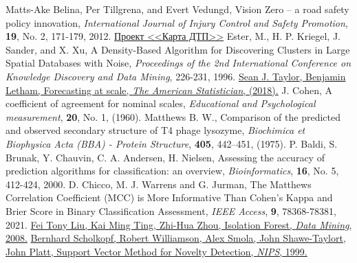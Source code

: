 \begin{thebibliography}{99}
	Matts-Ake Belina, Per Tillgrena, and Evert Vedungd, Vision Zero – a road safety policy innovation,
	\textit{International Journal of Injury Control and Safety Promotion}, \textbf{19}, No. 2, 171-179, 2012. 
	\href{https://dtp-stat.ru}
	{Проект <<Карта ДТП>>}
	Ester, M., H. P. Kriegel, J. Sander, and X. Xu, A Density-Based Algorithm for Discovering Clusters in Large Spatial Databases with Noise,
	\textit{Proceedings of the 2nd International Conference on Knowledge Discovery and Data Mining}, 226-231, 1996.
	\href{https://peerj.com/preprints/3190.pdf}{Sean J. Taylor, Benjamin Letham, Forecasting at scale, \textit{The American Statistician}, (2018).}
	J. Cohen, A coefficient of agreement for nominal scales, \textit{Educational and Psychological measurement}, \textbf{20}, No. 1, (1960).
	Matthews B. W., Comparison of the predicted and observed secondary structure of T4 phage lysozyme,
	\textit{Biochimica et Biophysica Acta (BBA) - Protein Structure}, \textbf{405}, 442–451, (1975).
	P. Baldi, S. Brunak, Y. Chauvin, C. A. Andersen, H. Nielsen, Assessing the accuracy of prediction algorithms for classification:
	an overview, \textit{Bioinformatics}, \textbf{16}, No. 5, 412-424, 2000.
	D. Chicco, M. J. Warrens and G. Jurman, 
	The Matthews Correlation Coefficient (MCC) is More Informative Than Cohen’s Kappa and Brier Score in Binary Classification Assessment,
	\textit{IEEE Access}, \textbf{9}, 78368-78381, 2021.
	\href{https://cs.nju.edu.cn/zhouzh/zhouzh.files/publication/icdm08b.pdf}
	{Fei Tony Liu, Kai Ming Ting, Zhi-Hua Zhou, Isolation Forest, \textit{Data Mining}, 2008.}
	\href{https://papers.nips.cc/paper/1999/file/8725fb777f25776ffa9076e44fcfd776-Paper.pdf}
	{Bernhard Scholkopf, Robert Williamson, Alex Smola, John Shawe-Taylort, John Platt, Support Vector Method for Novelty Detection,
	\textit{NIPS}, 1999.}
\end{thebibliography}
